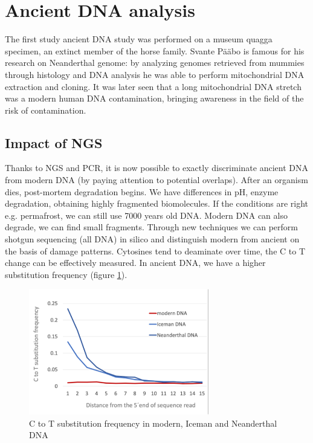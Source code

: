 \section{Ancient DNA analysis}
The first study ancient DNA study was performed on a museum quagga specimen, an extinct member of the horse family.
Svante Pääbo is famous for his research on Neanderthal genome: by analyzing genomes retrieved from mummies through histology and DNA analysis he was able to perform mitochondrial DNA extraction and cloning.
It was later seen that a long mitochondrial DNA stretch was a modern human DNA contamination, bringing awareness in the field of the risk of contamination.

	\subsection{Impact of NGS}
	Thanks to NGS and PCR, it is now possible to exactly discriminate ancient DNA from modern DNA (by paying attention to potential overlaps).
	After an organism dies, post-mortem degradation begins.
	We have differences in pH, enzyme degradation, obtaining highly fragmented biomolecules.
	If the conditions are right e.g. permafrost, we can still use 7000 years old DNA.
	Modern DNA can also degrade, we can find small fragments.
	Through new techniques we can perform shotgun sequencing (all DNA) in silico and distinguish modern from ancient on the basis of damage patterns.
	Cytosines tend to deaminate over time, the C to T change can be effectively measured.
	In ancient DNA, we have a higher substitution frequency (figure \ref{fig:ct}).

	\begin{figure}[h]
	\includegraphics[width=0.7\textwidth]{ct.png}
	\caption{\label{fig:ct} C to T substitution frequency in modern, Iceman and Neanderthal DNA}
	\end{figure}

